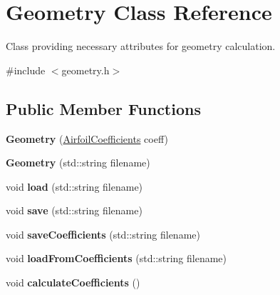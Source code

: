 \hypertarget{class_geometry}{}\section{Geometry Class Reference}
\label{class_geometry}


Class providing necessary attributes for geometry calculation.  




{\ttfamily \#include $<$geometry.\+h$>$}

\subsection*{Public Member Functions}
\begin{DoxyCompactItemize}
\item 
\mbox{\label{class_geometry_ae86ccba6c6c851a2ff39987c7a9e842a}} 
{\bfseries Geometry} (\hyperlink{struct_airfoil_coefficients}{Airfoil\+Coefficients} coeff)
\item 
\mbox{\label{class_geometry_a1ef839b1538d88e53b709c69da1845f8}} 
{\bfseries Geometry} (std\+::string filename)
\item 
\mbox{\label{class_geometry_a7ea790982829eda7a5fe4732b3e5aff3}} 
void {\bfseries load} (std\+::string filename)
\item 
\mbox{\label{class_geometry_a57c7730cefb1c3c75cdbbace6d499abc}} 
void {\bfseries save} (std\+::string filename)
\item 
\mbox{\label{class_geometry_a8c98e71eb0ad5fe42b6befe4dc0f7fb8}} 
void {\bfseries save\+Coefficients} (std\+::string filename)
\item 
\mbox{\label{class_geometry_aaa2c6da26d92831bce0132c7b27ef62a}} 
void {\bfseries load\+From\+Coefficients} (std\+::string filename)
\item 
\mbox{\label{class_geometry_a6c137c388ff6698152cb9b4f610ff12f}} 
void {\bfseries calculate\+Coefficients} ()
\item 
\mbox{\label{class_geometry_a5145d4ec1bdbc033eb510a54a6ac2eae}} 

\end{DoxyCompactItemize}
